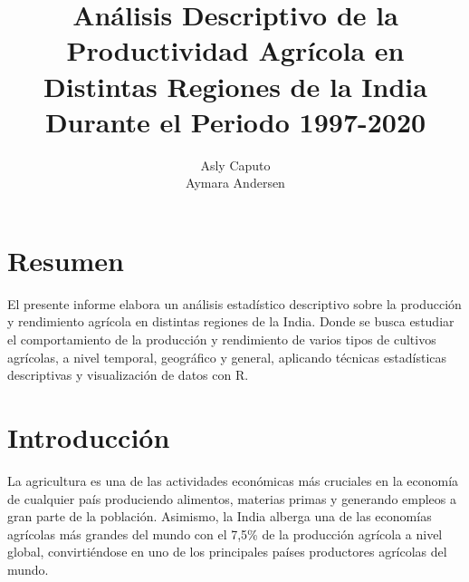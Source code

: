 \documentclass[oneside,11pt]{Latex/Classes/PhDthesisPSnPDF}
\title{Análisis Descriptivo de la Productividad Agrícola en Distintas
Regiones de la India Durante el Periodo 1997-2020}
\author{Asly Caputo \\ Aymara Andersen}
\begin{document}
\maketitle

\frontmatter


\setcounter{secnumdepth}{3}
\setcounter{tocdepth}{3}

\tableofcontents



\cleardoublepage

  \cleardoublepage       %
  \chapter*{Resumen}     %
  
  El presente informe elabora un análisis estadístico descriptivo sobre
la producción y rendimiento agrícola en distintas regiones de la India.
Donde se busca estudiar el comportamiento de la producción y rendimiento
de varios tipos de cultivos agrícolas, a nivel temporal, geográfico y
general, aplicando técnicas estadísticas descriptivas y visualización de
datos con
R.             %
  
  \cleardoublepage

\mainmatter
\def\baselinestretch{1.5}

\chapter*{Introducción}

La agricultura es una de las actividades económicas más cruciales en la
economía de cualquier país produciendo alimentos, materias primas y
generando empleos a gran parte de la población. Asimismo, la India
alberga una de las economías agrícolas más grandes del mundo con el
7,5\% de la producción agrícola a nivel global, convirtiéndose en uno de
los principales países productores agrícolas del mundo.\\
\end{document}

